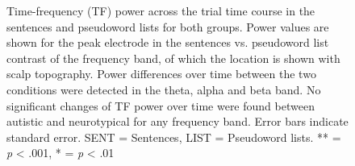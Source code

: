 \begin{figure}[!ht]
    \vspace{10pt}
	\centering
	\caption{Time-frequency (TF) power across the trial time course in the sentences and pseudoword lists for both groups. Power values are shown for the peak electrode in the sentences vs. pseudoword list contrast of the frequency band, of which the location is shown with scalp topography. Power differences over time between the two conditions were detected in the theta, alpha and beta band. No significant changes of TF power over time were found between autistic and neurotypical for any frequency band. Error bars indicate standard error. SENT = Sentences, LIST = Pseudoword lists. ** = \textit{p} < .001, * = \textit{p} < .01}
    \vspace*{-10pt}
	\label{fig:tf-dynamics-peak}
\end{figure}


